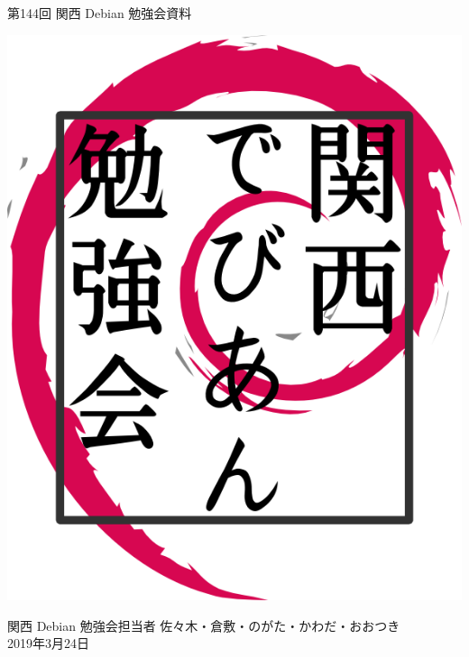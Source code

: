 \documentclass[mingoth,a4paper]{jsarticle}
\newcommand{\debmtgyear}{2019}
\newcommand{\debmtgdate}{24}
\newcommand{\debmtgmonth}{3}
\newcommand{\debmtgnumber}{144}
\begin{document}
\begin{titlepage}


 第\debmtgnumber{}回 関西 Debian 勉強会資料

\vspace{2cm}

\begin{center}
\includegraphics{image200802/kansaidebianlogo.png}
\end{center}

\begin{flushright}
\hfill{}関西 Debian 勉強会担当者 佐々木・倉敷・のがた・かわだ・おおつき \\
\hfill{}\debmtgyear{}年\debmtgmonth{}月\debmtgdate{}日
\end{flushright}

\thispagestyle{empty}
\end{titlepage}

\end{document}
